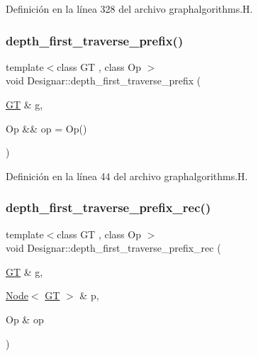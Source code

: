 Definición en la línea 328 del archivo graphalgorithms.\+H.

\mbox{\label{namespace_designar_afaa79311647a603f5c95d575f67ea767}} 
\subsubsection{\texorpdfstring{depth\+\_\+first\+\_\+traverse\+\_\+prefix()}{depth\_first\_traverse\_prefix()}\hspace{0.1cm}{\footnotesize\ttfamily [2/2]}}
{\footnotesize\ttfamily template$<$class GT , class Op $>$ \\
void Designar\+::depth\+\_\+first\+\_\+traverse\+\_\+prefix (\begin{DoxyParamCaption}\item[{\hyperlink{demo-buildgraph_8_c_a3001c40d2c31ca87ed96cd7d1334a55e}{GT} \&}]{g,  }\item[{Op \&\&}]{op = {\ttfamily Op()} }\end{DoxyParamCaption})}



Definición en la línea 44 del archivo graphalgorithms.\+H.

\mbox{\label{namespace_designar_a0b89964c32afcc315905100d3ae49ad6}} 
\subsubsection{\texorpdfstring{depth\+\_\+first\+\_\+traverse\+\_\+prefix\+\_\+rec()}{depth\_first\_traverse\_prefix\_rec()}}
{\footnotesize\ttfamily template$<$class GT , class Op $>$ \\
void Designar\+::depth\+\_\+first\+\_\+traverse\+\_\+prefix\+\_\+rec (\begin{DoxyParamCaption}\item[{\hyperlink{demo-buildgraph_8_c_a3001c40d2c31ca87ed96cd7d1334a55e}{GT} \&}]{g,  }\item[{\hyperlink{namespace_designar_a5af326c65aa2bd26b26c410f2030d09e}{Node}$<$ \hyperlink{demo-buildgraph_8_c_a3001c40d2c31ca87ed96cd7d1334a55e}{GT} $>$ \&}]{p,  }\item[{Op \&}]{op }\end{DoxyParamCaption})}



